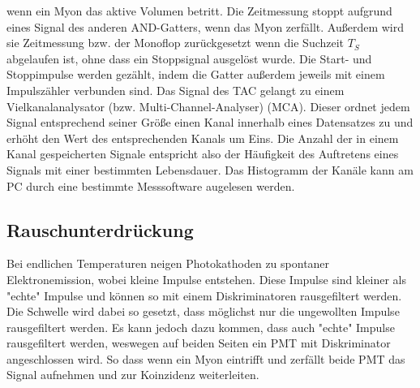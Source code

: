 wenn ein Myon das aktive Volumen betritt. Die Zeitmessung stoppt aufgrund eines Signal des anderen AND-Gatters, wenn das Myon zerfällt. 
Außerdem wird sie Zeitmessung bzw. der Monoflop zurückgesetzt wenn die Suchzeit $T_S$ abgelaufen ist, ohne dass ein Stoppsignal ausgelöst wurde.
Die Start- und Stoppimpulse werden gezählt, indem die Gatter außerdem jeweils mit einem Impulszähler verbunden sind.
Das Signal des TAC gelangt zu einem Vielkanalanalysator (bzw. Multi-Channel-Analyser) (MCA). Dieser ordnet jedem Signal entsprechend
seiner Größe einen Kanal innerhalb eines Datensatzes zu und erhöht den Wert des entsprechenden Kanals um Eins. Die Anzahl der in einem Kanal
gespeicherten Signale entspricht also der Häufigkeit des Auftretens eines Signals mit einer bestimmten Lebensdauer. Das Histogramm der
Kanäle kann am PC durch eine bestimmte Messsoftware augelesen werden.


\subsection{Rauschunterdrückung}
\label{subsec:Rauschunterdrückung}
Bei endlichen Temperaturen neigen Photokathoden zu spontaner Elektronemission, wobei kleine Impulse entstehen.
Diese Impulse sind kleiner als "echte" Impulse und können so mit einem Diskriminatoren rausgefiltert werden. Die Schwelle wird
dabei so gesetzt, dass möglichst nur die ungewollten Impulse rausgefiltert werden. Es kann jedoch dazu kommen, dass auch "echte"
Impulse rausgefiltert werden, weswegen auf beiden Seiten ein PMT mit Diskriminator angeschlossen wird. 
So dass wenn ein Myon eintrifft und zerfällt beide PMT das Signal aufnehmen und zur Koinzidenz weiterleiten.

